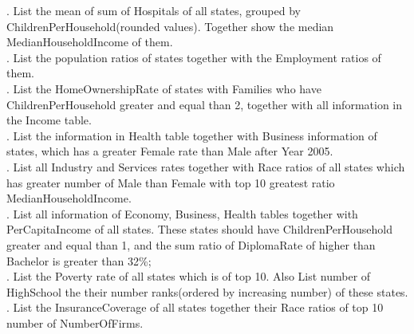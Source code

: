 \documentclass{article}
\begin{document}
. List the mean of sum of Hospitals of all states, grouped by ChildrenPerHousehold(rounded values). Together show the median MedianHouseholdIncome of them. \\

. List the population ratios of states together with the Employment ratios of them. \\

. List the HomeOwnershipRate of states with Families who have ChildrenPerHousehold greater and equal than 2, together with all information in the Income table. \\

. List the information in Health table together with Business information of states, which has a greater Female rate than Male after Year 2005. \\

. List all Industry and Services rates together with Race ratios of all states which has greater number of Male than Female with top 10 greatest ratio MedianHouseholdIncome. \\

. List all information of Economy, Business, Health tables together with PerCapitaIncome of all states. These states should have ChildrenPerHousehold greater and equal than 1, and the sum ratio of DiplomaRate of higher than Bachelor is greater than 32\%; \\

. List the Poverty rate of all states which is of top 10. Also List number of HighSchool the their number ranks(ordered by increasing number) of these states. \\

. List the InsuranceCoverage of all states together their Race ratios of top 10 number of NumberOfFirms.
\end{document}
